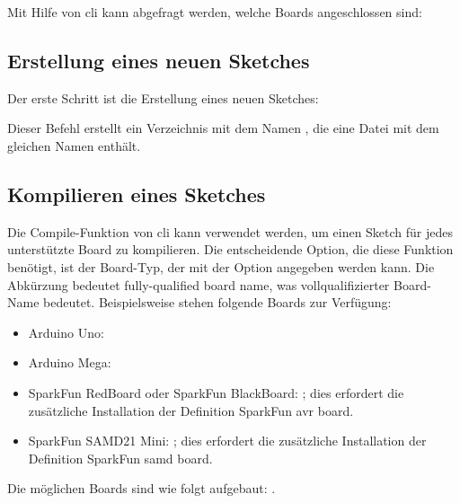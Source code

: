 Mit Hilfe von \ac{cli} kann abgefragt werden, welche Boards angeschlossen sind:

\medskip





\subsection{Erstellung eines neuen Sketches}

Der erste Schritt ist die Erstellung eines neuen Sketches:

\medskip


\medskip

Dieser Befehl erstellt ein Verzeichnis mit dem Namen , die eine Datei mit dem gleichen Namen enthält.

\subsection{Kompilieren eines Sketches}

Die Compile-Funktion von \ac{cli} kann verwendet werden, um einen Sketch für jedes unterstützte Board zu kompilieren. Die entscheidende Option, die diese Funktion benötigt, ist der Board-Typ, der mit der Option  angegeben werden kann. Die Abkürzung  bedeutet \glqq fully-qualified board name\grqq, was \glqq vollqualifizierter Board-Name\grqq{} bedeutet. Beispielsweise stehen folgende Boards zur Verfügung:


\begin{itemize}
  \item Arduino Uno: 
  \item Arduino Mega: 
  \item SparkFun RedBoard oder SparkFun BlackBoard: ; dies erfordert die zusätzliche Installation der Definition \glqq SparkFun avr board\grqq.
  \item  SparkFun SAMD21 Mini: ; dies erfordert die zusätzliche Installation der Definition \glqq SparkFun samd board\grqq.
\end{itemize}

Die möglichen Boards sind wie folgt aufgebaut:  .

